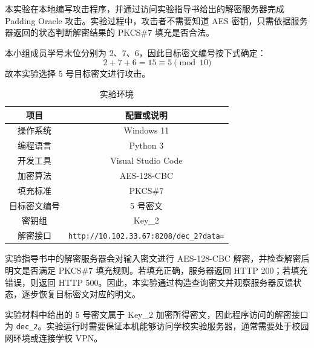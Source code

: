 本实验在本地编写攻击程序，并通过访问实验指导书给出的解密服务器完成 Padding Oracle 攻击。实验过程中，攻击者不需要知道 AES 密钥，只需依据服务器返回的状态判断解密结果的 PKCS\#7 填充是否合法。

本小组成员学号末位分别为 2、7、6，因此目标密文编号按下式确定：
\[
    2 + 7 + 6 = 15 \equiv 5 \pmod{10}
\]
故本实验选择 5 号目标密文进行攻击。

\begin{table}[H]
    \centering
    \caption{实验环境}
    \begin{tabular}{|c|c|}
        \hline
        项目 & 配置或说明 \\
        \hline
        操作系统 & Windows 11 \\
        \hline
        编程语言 & Python 3 \\
        \hline
        开发工具 & Visual Studio Code \\
        \hline
        加密算法 & AES-128-CBC \\
        \hline
        填充标准 & PKCS\#7 \\
        \hline
        目标密文编号 & 5 号密文 \\
        \hline
        密钥组 & Key\_2 \\
        \hline
        解密接口 & \verb|http://10.102.33.67:8208/dec_2?data=| \\
        \hline
    \end{tabular}
\end{table}

实验指导书中的解密服务器会对输入密文进行 AES-128-CBC 解密，并检查解密后明文是否满足 PKCS\#7 填充规则。若填充正确，服务器返回 HTTP 200；若填充错误，则返回 HTTP 500。因此，本实验通过构造查询密文并观察服务器反馈状态，逐步恢复目标密文对应的明文。

实验材料中给出的 5 号密文属于 Key\_2 加密所得密文，因此程序访问的解密接口为 \verb|dec_2|。实验运行时需要保证本机能够访问学校实验服务器，通常需要处于校园网环境或连接学校 VPN。
